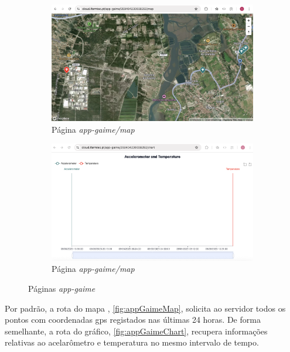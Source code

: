 \begin{figure}[!h]
	\centering
	\begin{subfigure}[c]{0.45\textwidth}
		\centering
		\includegraphics[width=\textwidth]{figs/appGaimeMap.png}
		\caption{Página \textit{app-gaime/map}}
		\label{fig:appGaimeMap}
	\end{subfigure}
	\hfill
	\begin{subfigure}[c]{0.45\textwidth}
        \centering
        \includegraphics[width=\textwidth]{figs/appGaimeChart.png}
		\caption{Página \textit{app-gaime/map}}
        \label{fig:appGaimeChart}
	\end{subfigure}
	\caption{Páginas \textit{app-gaime}}
\end{figure}

Por padrão, a rota do mapa , \autoref{fig:appGaimeMap}, solicita ao servidor todos os pontos com coordenadas \acs{gps} registados nas últimas 24 horas. De forma semelhante, a rota do gráfico, \autoref{fig:appGaimeChart}, recupera informações relativas ao acelarômetro e temperatura no mesmo intervalo de tempo. 


